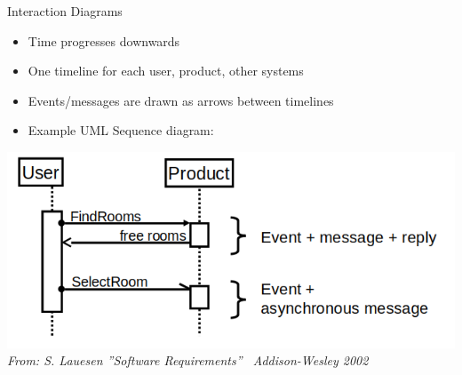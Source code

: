 \begin{Slide}{Interaction Diagrams}

\begin{itemize}
\item Time progresses downwards 
\item One timeline for each user, product, other systems
\item Events/messages are drawn as arrows between timelines
\item Example UML Sequence diagram:
\end{itemize}
\hfill\begin{minipage}[t]{0.8\textwidth}
\vspace{0.4em}\includegraphics[width=1.0\textwidth]{../img/uml-sequence-diagram}
{\vspace*{1em}\fontsize{5}{5}\itshape\selectfont From: S. Lauesen ''Software Requirements'' \textcopyright~Addison-Wesley 2002}
\end{minipage}

\end{Slide}
